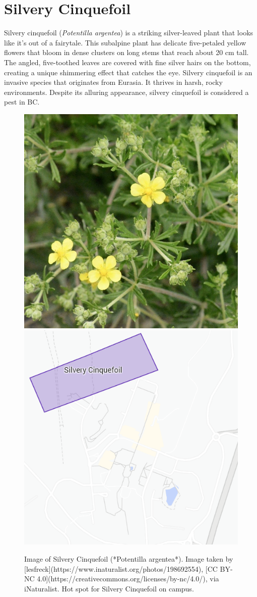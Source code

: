 \documentclass[
]{book}
\begin{document}
\hypertarget{silvery-cinquefoil}{%
\section{Silvery Cinquefoil}\label{silvery-cinquefoil}}

Silvery cinquefoil (\emph{Potentilla argentea}) is a striking silver-leaved plant that looks like it's out of a fairytale. This subalpine plant has delicate five-petaled yellow flowers that bloom in dense clusters on long stems that reach about 20 cm tall. The angled, five-toothed leaves are covered with fine silver hairs on the bottom, creating a unique shimmering effect that catches the eye. Silvery cinquefoil is an invasive species that originates from Eurasia. It thrives in harsh, rocky environments. Despite its alluring appearance, silvery cinquefoil is considered a pest in BC.

\begin{figure}

{\centering \includegraphics[width=0.49\linewidth,height=0.2\textheight]{plant_images/silvery_cinq_11} \includegraphics[width=0.49\linewidth,height=0.2\textheight]{plant_images/silveryconquefoil_hotspot_11} 

}

\caption{Image of Silvery Cinquefoil (*Potentilla argentea*). Image taken by [lesfreck](https://www.inaturalist.org/photos/198692554), [CC BY-NC 4.0](https://creativecommons.org/licenses/by-nc/4.0/), via iNaturalist. Hot spot for Silvery Cinquefoil on campus.}\label{fig:unnamed-chunk-13}
\end{figure}
\end{document}
